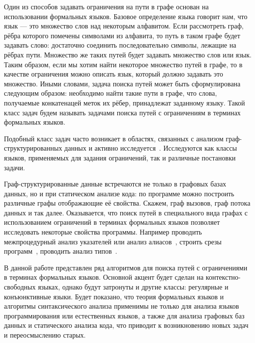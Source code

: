 Один из способов задавать ограничения на пути в графе основан на использовании формальных языков.
Базовое определение языка говорит нам, что язык --- это множество слов над некоторым алфавитом.
Если рассмотреть граф, рёбра которого помечены символами из алфавита, то путь в таком графе будет задавать слово: достаточно соединить последовательно символы, лежащие на рёбрах пути.
Множество же таких путей будет задавать множество слов или язык.
Таким образом, если мы хотим найти некоторое множество путей в графе, то в качестве ограничения можно описать язык, который должно задавать это множество.
Иными словами, задача поиска путей может быть сформулирована следующим образом: необходимо найти такие пути в графе, что слова, получаемые конкатенацей меток их рёбер, принадлежат заданному языку.
Такой класс задач будем называть задачами поиска путей с ограничениям в терминах формальных языков.

Подобный класс задач часто возникает в областях, связанных с анализом граф-структурированных данных и активно исследуется~\cite{doi:10.1137/S0097539798337716,axelsson2011formal,10.1007/978-3-642-22321-1_24,Ward:2010:CRL:1710158.1710234,barrett2007label,doi:10.1137/S0097539798337716}.
Исследуются как классы языков, применяемых для задания ограничений, так и различные постановки задачи.

Граф-структурированные данные встречаются не только в графовых базах данных, но и при статическом анализе кода: по программе можно построить различные графы отображающие её свойства.
Скажем, граф вызовов, граф потока данных и так далее.
Оказывается, что поиск путей в специального вида графах с использованием ограничений в терминах формальных языков позволяет исследовать некоторые свойства программы.
Например проводить межпроцедурный анализ указателей или анализ алиасов~\cite{Zheng,10.1145/2001420.2001440,10.1145/2714064.2660213}, строить срезы программ~\cite{10.1145/193173.195287}, проводить анализ типов~\cite{10.1145/373243.360208}.

В данной работе представлен ряд алгоритмов для поиска путей с ограничениями в терминах формальных языков.
Основной акцент будет сделан на контекстно-свободных языках, однако будут затронуты и другие классы: регулярные и конъюнктивные языки.
Будет показано, что теория формальных языков и алгоритмы синтаксического анализа применимы не только для анализа языков программирования или естественных языков, а также для анализа графовых баз данных и статического анализа кода, что приводит к возникновению новых задач и переосмыслению старых.


